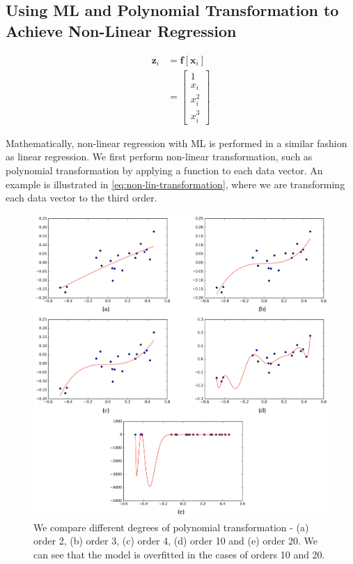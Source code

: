 \documentclass[11pt,openright,a4paper]{article}
\numberwithin{equation}{section}
\begin{document}
\subsection{Using ML and Polynomial Transformation to Achieve Non-Linear Regression}
\begin{equation} \label{eq:non-lin-transformation}
    \begin{aligned}
        \mathbf{z}_i &= \mathbf{f} \left [ \mathbf{x}_i  \right ]
        \\
        &= 
        \begin{bmatrix}
            1 \\
            x_i \\
            x_i^2 \\
            x_i^3
        \end{bmatrix}
    \end{aligned}
\end{equation}

Mathematically, non-linear regression with ML is performed in a similar fashion as linear regression. We first perform non-linear transformation, such as polynomial transformation by applying a function to each data vector. An example is illustrated in \autoref{eq:non-lin-transformation}, where we are transforming each data vector to the third order.

\begin{figure}
  \centering
  \includegraphics[width=1\textwidth]{non-combined}
	\caption{We compare different degrees of polynomial transformation - (a) order 2, (b) order 3, (c) order 4, (d) order 10 and (e) order 20. We can see that the model is overfitted in the cases of orders 10 and 20.}
  \label{fig:non-combined}
\end{figure} 
\end{document}
